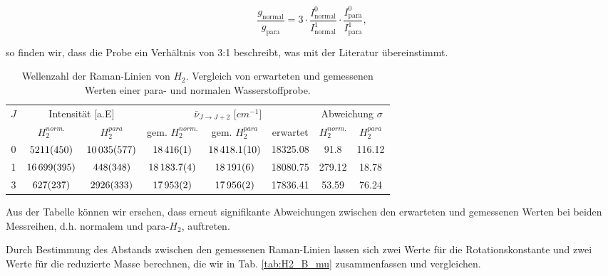 \documentclass[11pt]{article}
\begin{document}
\begin{equation}
	\frac{g_\text{normal}}{g_\text{para}}=3\cdot\frac{I_\text{normal}^0}{I_\text{normal}^1}\cdot\frac{I_\text{para}^0}{I_\text{para}^1},
\end{equation}

so finden wir, dass die Probe ein Verhältnis von 3:1 beschreibt, was mit der Literatur übereinstimmt.

\begin{table}[!htbp]
 \begin{center}
  \caption{\small Wellenzahl der Raman-Linien von $H_2$. Vergleich von erwarteten und gemessenen Werten einer para- und normalen Wasserstoffprobe.}
  \label{tab:H2}
  \renewcommand{\arraystretch}{1.3} %
  \begin{tabular}{|c|c|c|c|c|c|c|c|}
  \hline
\multirow{2}{*}{$J$}&\multicolumn{2}{c|}{Intensität [a.E]}& \multicolumn{3}{c|}{$\bar{\nu}_{J\to J+2}$ [$\unit{cm^{-1}}$]} & \multicolumn{2}{c|}{ Abweichung $\sigma$} \\ \cline{2-8} %
 					 &$H_2^{norm.}$	&	$H_2^{para}$ & gem. $H_2^{norm.}$ & gem. $H_2^{para}$& erwartet &  $H_2^{norm.}$	&	$H_2^{para}$\\ 
  \hline
	\hline 
0 &	$\num{5211\pm450}$ 	&	$\num{10035\pm577}$	&	$\num{18416	\pm 1}$	& $\num{18418.1\pm 1}$	& 18325.08	& 91.8	& 116.12 \\ 
1 & 	$\num{16699\pm395}$	&	$\num{448\pm348}$	&	$\num{18183.7\pm0.4}$& $\num{18191\pm6}$	& 18080.75	& 279.12	& 18.78 \\ 
3 &	$\num{627\pm237}$	&	$\num{2926\pm333}$	&	$\num{17953\pm2}$	& $\num{17956\pm2}$	& 17836.41	& 53.59	& 76.24\\ 
	\hline
  \end{tabular}
  \renewcommand{\arraystretch}{1}
 \end{center}
\end{table}

Aus der Tabelle können wir ersehen, dass erneut signifikante Abweichungen zwischen den erwarteten und gemessenen Werten bei beiden Messreihen, d.h. normalem und para-$H_2$, auftreten.

Durch Bestimmung des Abstands zwischen den gemessenen Raman-Linien lassen sich zwei Werte für die Rotationskonstante und zwei Werte für die reduzierte Masse berechnen, die wir in Tab. \ref{tab:H2_B_mu} zusammenfassen und vergleichen.
\end{document}
